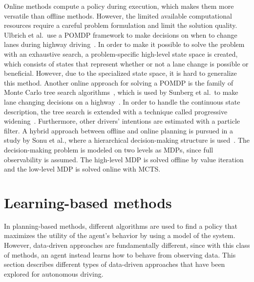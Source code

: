 Online methods compute a policy during execution, which makes them more versatile than offline methods. However, the limited available computational resources require a careful problem formulation and limit the solution quality.
Ulbrich et al.\ use a POMDP framework to make decisions on when to change lanes during highway driving~\cite{Ulbrich2015}. In order to make it possible to solve the problem with an exhaustive search, a problem-specific high-level state space is created, which consists of states that represent whether or not a lane change is possible or beneficial. However, due to the specialized state space, it is hard to generalize this method.
Another online approach for solving a POMDP is the family of Monte Carlo tree search algorithms~\cite{Browne2012}, which is used by Sunberg et al.\ to make lane changing decisions on a highway~\cite{Sunberg2017}. In order to handle the continuous state description, the tree search is extended with a technique called progressive widening~\cite{Couetoux2011}. Furthermore, other drivers' intentions are estimated with a particle filter. %
A hybrid approach between offline and online planning is pursued in a study by Sonu et al., where a hierarchical decision-making structure is used~\cite{Sonu2018}. The decision-making problem is modeled on two levels as MDPs, since full observability is assumed. The high-level MDP is solved offline by value iteration and the low-level MDP is solved online with MCTS.


\vspace{8pt}

\section{Learning-based methods}

In planning-based methods, different algorithms are used to find a policy that maximizes the utility of the agent's behavior by using a model of the system. However, data-driven approaches are fundamentally different, since with this class of methods, an agent instead learns how to behave from observing data. This section describes different types of data-driven approaches that have been explored for autonomous driving.


